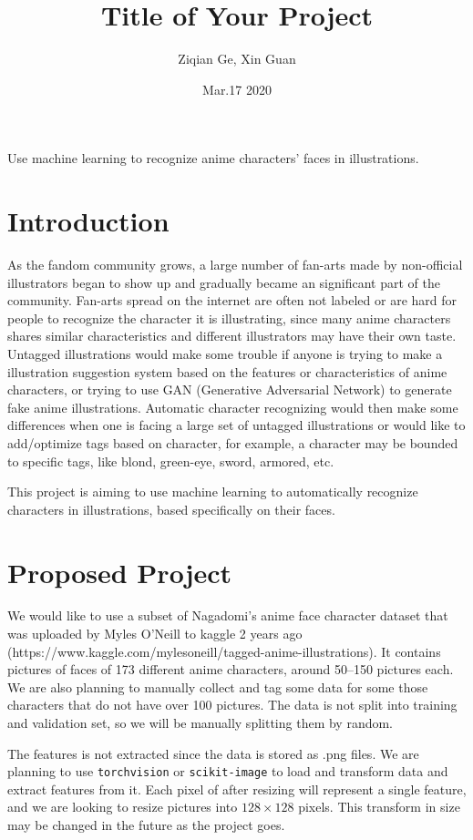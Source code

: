 \documentclass[12pt]{article}
\title{Title of Your Project}
\author{Ziqian Ge, Xin Guan}
\date{Mar.17 2020}
\begin{document}
\maketitle

\abstract
Use machine learning to recognize anime characters' faces in illustrations.

\section{Introduction}
As the fandom community grows, a large number of fan-arts made by non-official illustrators began to show up and gradually became an significant part of the community.
Fan-arts spread on the internet are often not labeled or are hard for people to recognize the character it is illustrating, since many anime characters shares similar characteristics and different illustrators may have their own taste.
Untagged illustrations would make some trouble if anyone is trying to make a illustration suggestion system based on the features or characteristics of anime characters, or trying to use GAN (Generative Adversarial Network) to generate fake anime illustrations.
Automatic character recognizing would then make some differences when one is facing a large set of untagged illustrations or would like to add/optimize tags based on character, for example, a character may be bounded to specific tags, like blond, green-eye, sword, armored, etc.

This project is aiming to use machine learning to automatically recognize characters in illustrations, based specifically on their faces.


\section{Proposed Project}
We would like to use a subset of Nagadomi's anime face character dataset that was uploaded by Myles O'Neill to kaggle 2 years ago (https://www.kaggle.com/mylesoneill/tagged-anime-illustrations).
It contains pictures of faces of 173 different anime characters, around 50--150 pictures each.
We are also planning to manually collect and tag some data for some those characters that do not have over 100 pictures.
The data is not split into training and validation set, so we will be manually splitting them by random.

The features is not extracted since the data is stored as .png files.
We are planning to use \texttt{torchvision} or \texttt{scikit-image} to load and transform data and extract features from it.
Each pixel of after resizing will represent a single feature, and we are looking to resize pictures into $128 \times 128$ pixels.
This transform in size  may be changed in the future as the project goes.
\end{document}
